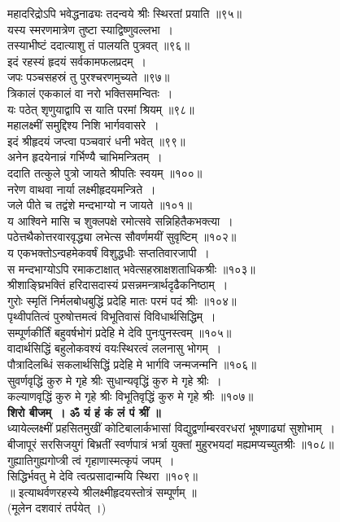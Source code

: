 \documentclass[twoside,top=1.7cm, bottom=1.7cm, outer=1cm,landscape, inner=1.5cm,a5paper,]{book}
\begin{document}
\begin{center}
महादरिद्रोऽपि भवेद्धनाढ्यः तदन्वये श्रीः स्थिरतां प्रयाति ॥९५॥\\[10pt]
यस्य स्मरणमात्रेण तुष्टा स्याद्विष्णुवल्लभा~।\\
तस्याभीष्टं ददात्याशु तं पालयति पुत्रवत् ॥९६॥\\[10pt]
\newpage
इदं रहस्यं हृदयं सर्वकामफलप्रदम्~।\\
जपः पञ्चसहस्रं तु पुरश्चरणमुच्यते ॥९७॥\\[10pt]
त्रिकालं एककालं वा नरो भक्तिसमन्वितः~।\\
यः पठेत् शृणुयाद्वापि स याति परमां श्रियम् ॥९८॥\\[10pt]
महालक्ष्मीं समुद्दिश्य निशि भार्गववासरे~।\\
इदं श्रीहृदयं जप्त्वा पञ्चवारं धनी भवेत् ॥९९॥\\[10pt]
अनेन हृदयेनान्नं गर्भिण्यै चाभिमन्त्रितम्~।\\
ददाति तत्कुले पुत्रो जायते श्रीपतिः स्वयम् ॥१००॥\\[10pt]
\newpage
नरेण वाथवा नार्या लक्ष्मीहृदयमन्त्रिते~।\\
जले पीते च तद्वंशे मन्दभाग्यो न जायते ॥१०१॥\\[10pt]
य आश्विने मासि च शुक्लपक्षे रमोत्सवे सन्निहितैकभक्त्या~।\\
पठेत्तथैकोत्तरवारवृद्ध्या लभेत्स सौवर्णमयीं सुवृष्टिम् ॥१०२॥\\[10pt]
य एकभक्तोऽन्वहमेकवर्षं विशुद्धधीः सप्ततिवारजापी~।\\
स मन्दभाग्योऽपि रमाकटाक्षात् भवेत्सहस्राक्षशताधिकश्रीः ॥१०३॥\\[10pt]
श्रीशाङ्घ्रिभक्तिं हरिदासदास्यं प्रसन्नमन्त्रार्थदृढैकनिष्ठाम्~।\\
गुरोः स्मृतिं निर्मलबोधबुद्धिं प्रदेहि मातः परमं पदं श्रीः ॥१०४॥\\[10pt]
\newpage
पृथ्वीपतित्वं पुरुषोत्तमत्वं विभूतिवासं विविधार्थसिद्धिम्~।\\
सम्पूर्णकीर्तिं बहुवर्षभोगं प्रदेहि मे देवि पुनःपुनस्त्वम् ॥१०५॥\\[10pt]
वादार्थसिद्धिं बहुलोकवश्यं वयःस्थिरत्वं ललनासु भोगम्~।\\
पौत्रादिलब्धिं सकलार्थसिद्धिं प्रदेहि मे भार्गवि जन्मजन्मनि ॥१०६॥\\[10pt]
सुवर्णवृद्धिं कुरु मे गृहे श्रीः सुधान्यवृद्धिं कुरु मे गृहे श्रीः~।\\
कल्याणवृद्धिं कुरु मे गृहे श्रीः विभूतिवृद्धिं कुरु मे गृहे श्रीः ॥१०७॥\\[10pt]
{\bfseries शिरो बीजम्~। ॐ यं हं कं लं पं श्रीं ॥}\\[10pt]
ध्यायेल्लक्ष्मीं प्रहसितमुखीं कोटिबालार्कभासां
विद्युद्वर्णाम्बरवरधरां भूषणाढ्यां सुशोभाम्~।\\
बीजापूरं सरसिजयुगं बिभ्रतीं स्वर्णपात्रं
भर्त्रा युक्तां मुहुरभयदां मह्यमप्यच्युतश्रीः ॥१०८॥\\[10pt]
गुह्यातिगुह्यगोप्त्री त्वं गृहाणास्मत्कृपं जपम्~।\\
सिद्धिर्भवतु मे देवि त्वत्प्रसादान्मयि स्थिरा ॥१०९॥\\[10pt]
॥ इत्याथर्वणरहस्ये श्रीलक्ष्मीहृदयस्तोत्रं सम्पूर्णम् ॥\\[10pt]
(मूलेन दशवारं तर्पयेत् ।)
\end{center}
\end{document}
